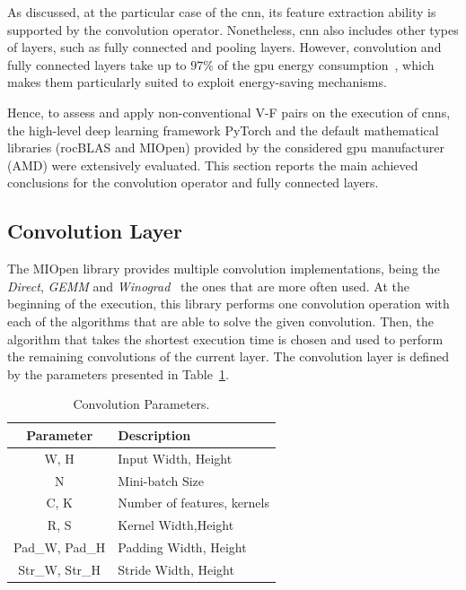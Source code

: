 As discussed, at the particular case of the \acrshort{cnn}, its feature extraction ability is supported by the convolution operator. Nonetheless, \acrshort{cnn} also includes other types of layers, such as fully connected and pooling layers. However, convolution and fully connected layers take up to $97\%$ of the \acrshort{gpu} energy consumption~\cite{li_evaluating_2016}, which makes them particularly suited to exploit energy-saving mechanisms. 

Hence, to assess and apply non-conventional V-F pairs on the execution of \acrshort{cnn}s, the high-level deep learning framework PyTorch and the default mathematical libraries (rocBLAS and MIOpen) provided by the considered \acrshort{gpu} manufacturer (AMD) were extensively evaluated. This section reports the main achieved conclusions for the convolution operator and fully connected layers.

\subsection{Convolution Layer}

The MIOpen library provides multiple convolution implementations, being the \textit{Direct}, \textit{GEMM} and \textit{Winograd}~\cite{khan_miopen_2019} the ones that are more often used. 
At the beginning of the execution, this library performs one convolution operation with each of the algorithms that are able to solve the given convolution. Then, the algorithm that takes the shortest execution time is chosen and used to perform the remaining convolutions of the current layer. The convolution layer is defined by the parameters presented in Table~\ref{tab:convparams}. 

\begin{table}[htbp]
\begin{center}
\begin{tabular}{cl}
\hline
\textbf{Parameter}&\textbf{Description} \\ 
\hline
W, H & Input Width, Height\\
N & Mini-batch Size \\
C, K & Number of features, kernels \\
R, S & Kernel Width,Height\\
Pad\_W, Pad\_H & Padding Width, Height \\
Str\_W, Str\_H & Stride Width, Height \\
\hline
\end{tabular}
\label{tab:convparams}
\end{center}

\caption{Convolution Parameters.}
\end{table}

